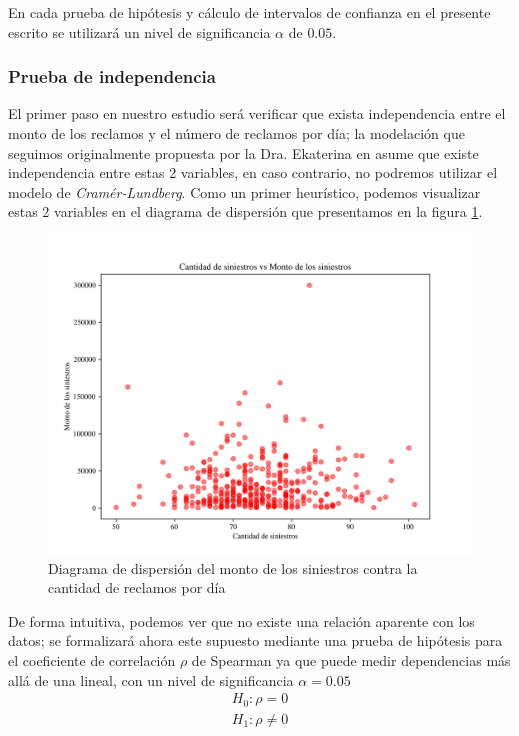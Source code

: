 \documentclass[journal]{IEEEtran}
\begin{document}
            En cada prueba de hipótesis y cálculo de intervalos de confianza en el presente escrito se utilizará un nivel de significancia $\alpha$ de $0.05$.

            \subsubsection{Prueba de independencia}
            
                El primer paso en nuestro estudio será verificar que exista independencia entre el monto de los reclamos y el número de reclamos por día; la modelación que seguimos originalmente propuesta por la Dra. Ekaterina en \cite{ekaterina} asume que existe independencia entre estas 2 variables, en caso contrario, no podremos utilizar el modelo de \emph{Cramér-Lundberg}. Como un primer heurístico, podemos visualizar estas 2 variables en el diagrama de dispersión que presentamos en la figura \ref{img:scatter-independence}.
                \begin{figure}[!htbp]
                    \centering
                    \includegraphics[scale=0.45]{img/independent.png}
                    \caption{Diagrama de dispersión del monto de los siniestros contra la cantidad de reclamos por día}
                    \label{img:scatter-independence}
                \end{figure}

                De forma intuitiva, podemos ver que no existe una relación aparente con los datos; se formalizará ahora este supuesto mediante una prueba de hipótesis para el coeficiente de correlación $\rho$ de Spearman ya que puede medir dependencias más allá de una lineal, con un nivel de significancia $\alpha = 0.05$
                \begin{gather*}
                    H_0: \rho = 0 \\
                    H_1: \rho \neq 0
                \end{gather*}
\end{document}
